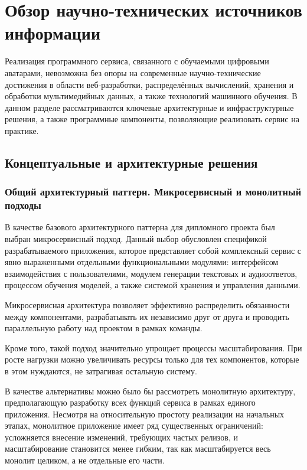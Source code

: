 \chapter{Обзор научно-технических источников информации} 

Реализация программного сервиса, связанного с обучаемыми цифровыми аватарами,
невозможна без опоры на современные научно-технические достижения
в области веб-разработки, распределённых вычислений,
хранения и обработки мультимедийных данных, а также технологий машинного обучения.
В данном разделе рассматриваются ключевые архитектурные и инфраструктурные решения,
а также программные компоненты, позволяющие реализовать сервис на практике.

\section{Концептуальные и архитектурные решения}
\subsection{Общий архитектурный паттерн. Микросервисный и монолитный подходы}

В качестве базового архитектурного паттерна
для дипломного проекта был выбран микросервисный подход.
Данный выбор обусловлен спецификой разрабатываемого приложения,
которое представляет собой комплексный сервис
с явно выраженными отдельными функциональными модулями:
интерфейсом взаимодействия с пользователями,
модулем генерации текстовых и аудиоответов,
процессом обучения моделей,
а также системой хранения и управления данными.

Микросервисная архитектура позволяет эффективно
распределить обязанности между компонентами,
разрабатывать их независимо друг от друга
и проводить параллельную работу над проектом в рамках команды.

Кроме того, такой подход значительно упрощает
процессы масштабирования.
При росте нагрузки можно увеличивать ресурсы
только для тех компонентов,
которые в этом нуждаются,
не затрагивая остальную систему.

В качестве альтернативы можно было бы рассмотреть монолитную архитектуру,
предполагающую разработку всех функций сервиса
в рамках единого приложения.
Несмотря на относительную простоту реализации на начальных этапах,
монолитное приложение имеет ряд существенных ограничений:
усложняется внесение изменений,
требующих частых релизов,
и масштабирование становится менее гибким,
так как масштабируется весь монолит целиком,
а не отдельные его части.

